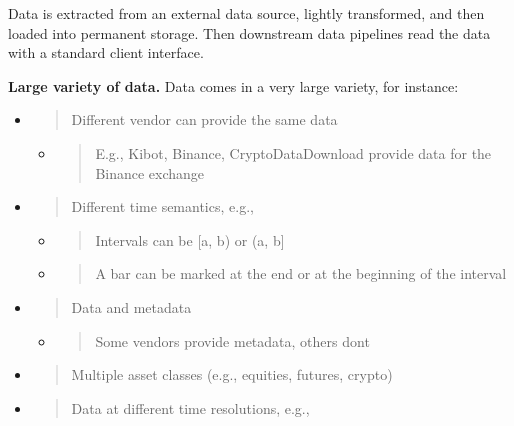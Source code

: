 \documentclass[11pt, reqno]{amsart}
\begin{document}
Data is extracted from an external data source, lightly transformed, and
then loaded into permanent storage. Then downstream data pipelines read
the data with a standard client interface.

\textbf{Large variety of data.} Data comes in a very large variety, for
instance:

\begin{itemize}
\item
  \begin{quote}
  Different vendor can provide the same data
  \end{quote}

  \begin{itemize}
  \item
    \begin{quote}
    E.g., Kibot, Binance, CryptoDataDownload provide data for the
    Binance exchange
    \end{quote}
  \end{itemize}
\item
  \begin{quote}
  Different time semantics, e.g.,
  \end{quote}

  \begin{itemize}
  \item
    \begin{quote}
    Intervals can be {[}a, b) or (a, b{]}
    \end{quote}
  \item
    \begin{quote}
    A bar can be marked at the end or at the beginning of the interval
    \end{quote}
  \end{itemize}
\item
  \begin{quote}
  Data and metadata
  \end{quote}

  \begin{itemize}
  \item
    \begin{quote}
    Some vendors provide metadata, others don\textquotesingle t
    \end{quote}
  \end{itemize}
\item
  \begin{quote}
  Multiple asset classes (e.g., equities, futures, crypto)
  \end{quote}
\item
  \begin{quote}
  Data at different time resolutions, e.g.,
  \end{quote}


\end{itemize}
\end{document}
